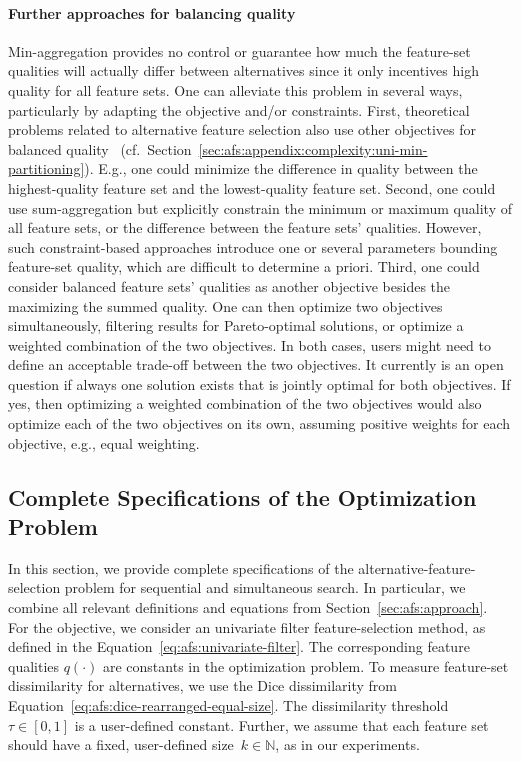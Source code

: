 \documentclass{article}
\theoremstyle{definition}
\begin{document}
\paragraph{Further approaches for balancing quality}

Min-aggregation provides no control or guarantee how much the feature-set qualities will actually differ between alternatives since it only incentives high quality for all feature sets.
One can alleviate this problem in several ways, particularly by adapting the objective and/or constraints.
First, theoretical problems related to alternative feature selection also use other objectives for balanced quality~\cite{korf2010objective, lawrinenko2017identical} (cf.~Section~\ref{sec:afs:appendix:complexity:uni-min-partitioning}).
E.g., one could minimize the difference in quality between the highest-quality feature set and the lowest-quality feature set.
Second, one could use sum-aggregation but explicitly constrain the minimum or maximum quality of all feature sets, or the difference between the feature sets' qualities.
However, such constraint-based approaches introduce one or several parameters bounding feature-set quality, which are difficult to determine a priori.
Third, one could consider balanced feature sets' qualities as another objective besides the maximizing the summed quality.
One can then optimize two objectives simultaneously, filtering results for Pareto-optimal solutions, or optimize a weighted combination of the two objectives.
In both cases, users might need to define an acceptable trade-off between the two objectives.
It currently is an open question if always one solution exists that is jointly optimal for both objectives.
If yes, then optimizing a weighted combination of the two objectives would also optimize each of the two objectives on its own, assuming positive weights for each objective, e.g., equal weighting.

\subsection{Complete Specifications of the Optimization Problem}
\label{sec:afs:appendix:complete-optimization-problem}

In this section, we provide complete specifications of the alternative-feature-selection problem for sequential and simultaneous search.
In particular, we combine all relevant definitions and equations from Section~\ref{sec:afs:approach}.
For the objective, we consider an univariate filter feature-selection method, as defined in the Equation~\ref{eq:afs:univariate-filter}.
The corresponding feature qualities $q(\cdot)$ are constants in the optimization problem.
To measure feature-set dissimilarity for alternatives, we use the Dice dissimilarity from Equation~\ref{eq:afs:dice-rearranged-equal-size}.
The dissimilarity threshold~$\tau \in [0,1]$ is a user-defined constant.
Further, we assume that each feature set should have a fixed, user-defined size~$k \in \mathbb{N}$, as in our experiments.
\end{document}
